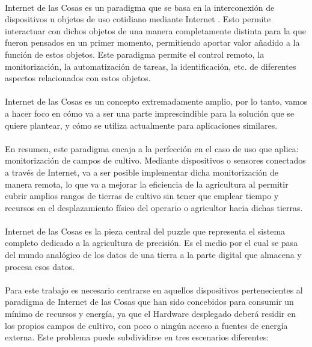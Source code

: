 \documentclass[../../memoria.tex]{subfiles}
\begin{document}
\paragraph{}
Internet de las Cosas es un paradigma que se basa en la interconexión de dispositivos u objetos de uso cotidiano mediante Internet \cite{iotwiki}. Esto permite interactuar con dichos objetos de una manera completamente distinta para la que fueron pensados en un primer momento, permitiendo aportar valor añadido a la función de estos objetos. Este paradigma permite el control remoto, la monitorización, la automatización de tareas, la identificación, etc. de diferentes aspectos relacionados con estos objetos.

\paragraph{}
Internet de las Cosas es un concepto extremadamente amplio, por lo tanto, vamos a hacer foco en cómo va a ser una parte imprescindible para la solución que se quiere plantear, y cómo se utiliza actualmente para aplicaciones similares.

\paragraph{}
En resumen, este paradigma encaja a la perfección en el caso de uso que aplica: monitorización de campos de cultivo. Mediante dispositivos o sensores conectados a través de Internet, va a ser posible implementar dicha monitorización de manera remota, lo que va a mejorar la eficiencia de la agricultura al permitir cubrir amplios rangos de tierras de cultivo sin tener que emplear tiempo y recursos en el desplazamiento físico del operario o agricultor hacia dichas tierras.

\paragraph{}
Internet de las Cosas es la pieza central del puzzle que representa el sistema completo dedicado a la agricultura de precisión. Es el medio por el cual se pasa del mundo analógico de los datos de una tierra a la parte digital que almacena y procesa esos datos.

\paragraph{}
Para este trabajo es necesario centrarse en aquellos dispositivos pertenecientes al paradigma de Internet de las Cosas que han sido concebidos para consumir un mínimo de recursos y energía, ya que el Hardware desplegado deberá residir en los propios campos de cultivo, con poco o ningún acceso a fuentes de energía externa. Este problema puede subdividirse en tres escenarios diferentes:
\end{document}
